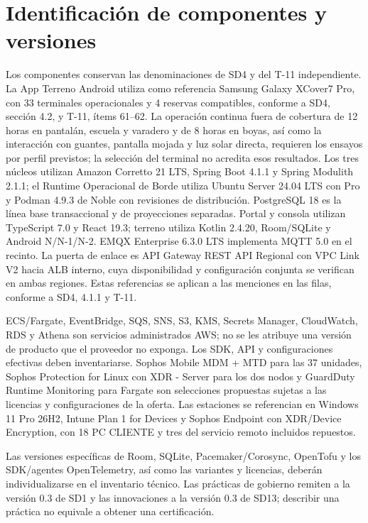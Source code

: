 \section*{Identificación de componentes y versiones}
Los componentes conservan las denominaciones de SD4 y del T-11 independiente. La App Terreno Android utiliza como referencia Samsung Galaxy XCover7 Pro, con 33 terminales operacionales y 4 reservas compatibles, conforme a SD4, sección 4.2, y T-11, ítems 61--62. La operación continua fuera de cobertura de 12 horas en pantalán, escuela y varadero y de 8 horas en boyas, así como la interacción con guantes, pantalla mojada y luz solar directa, requieren los ensayos por perfil previstos; la selección del terminal no acredita esos resultados.
Los tres núcleos utilizan Amazon Corretto 21 LTS, Spring Boot 4.1.1 y
Spring Modulith 2.1.1; el Runtime Operacional de Borde utiliza Ubuntu
Server 24.04 LTS con Pro y Podman 4.9.3 de Noble con revisiones de distribución.
PostgreSQL 18 es la línea base transaccional y de proyecciones separadas.
Portal y consola utilizan TypeScript 7.0 y React 19.3; terreno utiliza
Kotlin 2.4.20, Room/SQLite y Android N/N-1/N-2. EMQX Enterprise 6.3.0 LTS
implementa MQTT 5.0 en el recinto. La puerta de enlace es API Gateway
REST API Regional con VPC Link V2 hacia ALB interno, cuya disponibilidad y
configuración conjunta se verifican en ambas regiones. Estas referencias
se aplican a las menciones en las filas, conforme a SD4, 4.1.1 y T-11.

ECS/Fargate, EventBridge, SQS, SNS, S3, KMS, Secrets Manager,
CloudWatch, RDS y Athena son servicios administrados AWS; no se les
atribuye una versión de producto que el proveedor no exponga. Los SDK,
API y configuraciones efectivas deben inventariarse. Sophos Mobile
MDM + MTD para las 37 unidades, Sophos Protection for Linux con XDR - Server
para los dos nodos y GuardDuty Runtime Monitoring para Fargate son
selecciones propuestas sujetas a las licencias y configuraciones de la oferta.
Las estaciones se referencian en Windows 11 Pro 26H2, Intune Plan 1 for Devices y Sophos Endpoint con XDR/Device Encryption, con 18 PC CLIENTE y tres del servicio remoto incluidos repuestos.

Las versiones específicas de Room, SQLite, Pacemaker/Corosync, OpenTofu y los SDK/agentes OpenTelemetry, así como las variantes y licencias, deberán individualizarse en el inventario técnico. Las prácticas de gobierno remiten a la versión 0.3 de SD1 y las innovaciones a la versión 0.3 de SD13; describir una práctica no equivale a obtener una certificación.

